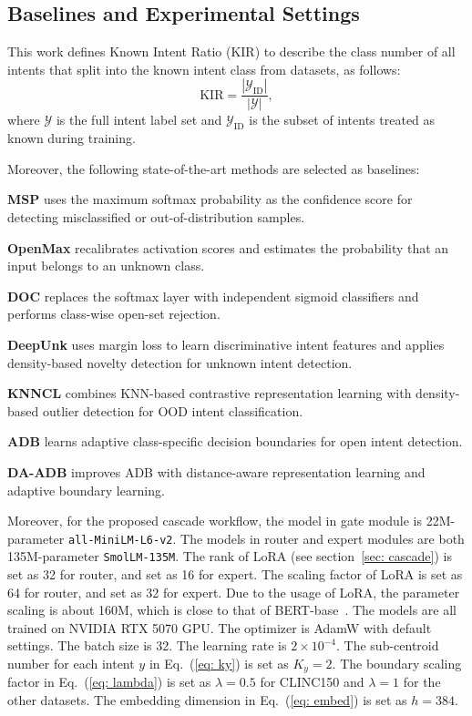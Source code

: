 \documentclass[11pt]{article}
\begin{document}
\subsection{Baselines and Experimental Settings}

This work defines Known Intent Ratio (KIR) to describe the class number of all intents that split into the known intent class from datasets, as follows:
\begin{equation}
\text{KIR}=\frac{|\mathcal{Y}_{\mathrm{ID}}|}{|\mathcal{Y}|},
\end{equation}
where $\mathcal{Y}$ is the full intent label set and $\mathcal{Y}_{\mathrm{ID}}$ is the subset of intents treated as known during training.

Moreover, the following state-of-the-art methods are selected as baselines: 

\textbf{MSP} \citep{hendrycks2017baseline} uses the maximum softmax probability as the confidence score for detecting misclassified or out-of-distribution samples.

\textbf{OpenMax} \citep{bendale2016towards} recalibrates activation scores and estimates the probability that an input belongs to an unknown class.

\textbf{DOC} \citep{shu2017doc} replaces the softmax layer with independent sigmoid classifiers and performs class-wise open-set rejection.

\textbf{DeepUnk} \citep{lin2019deep} uses margin loss to learn discriminative intent features and applies density-based novelty detection for unknown intent detection.

\textbf{KNNCL} \citep{zhou2022knn} combines KNN-based contrastive representation learning with density-based outlier detection for OOD intent classification.

\textbf{ADB} \citep{zhang2021adaptive} learns adaptive class-specific decision boundaries for open intent detection.

\textbf{DA-ADB} \citep{zhang2023learning} improves ADB with distance-aware representation learning and adaptive boundary learning.

Moreover, for the proposed cascade workflow, the model in gate module is 22M-parameter \texttt{all-MiniLM-L6-v2}. The models in router and expert modules are both 135M-parameter \texttt{SmolLM-135M}. The rank of LoRA (see section~\ref{sec: cascade}) is set as 32 for router, and set as 16 for expert. The scaling factor of LoRA is set as 64 for router, and set as 32 for expert. Due to the usage of LoRA, the parameter scaling is about 160M, which is close to that of BERT-base~\citep{zeng2021modeling, zhang2021adaptive, li2025multi}. The models are all trained on NVIDIA RTX 5070 GPU. The optimizer is AdamW with default settings. The batch size is 32. The learning rate is $2\times 10^{-4}$. The sub-centroid number for each intent $y$ in Eq.~(\ref{eq: ky}) is set as $K_y=2$. The boundary scaling factor in Eq.~(\ref{eq: lambda}) is set as $\lambda = 0.5$ for CLINC150 and $\lambda = 1$ for the other datasets. The embedding dimension in Eq.~(\ref{eq: embed}) is set as $h=384$.
\end{document}

